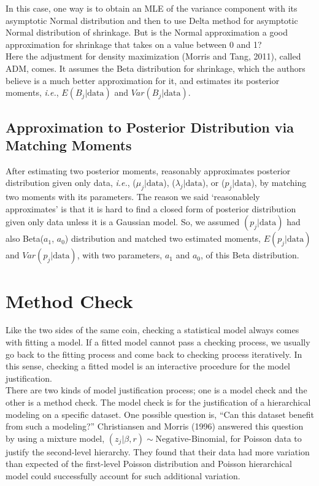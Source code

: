 \documentclass[article]{jss}
\begin{document}
In this case, one way is to obtain an MLE of the variance component with its asymptotic Normal distribution and then to use Delta method for asymptotic Normal distribution of shrinkage. But is the Normal approximation a good approximation for shrinkage that takes on a value between 0 and 1?
\\

Here the adjustment for density maximization (Morris and Tang, 2011), called ADM, comes. It assumes the Beta distribution for shrinkage, which the authors believe is a much better approximation for it, and estimates its posterior moments, \emph{i.e.}, $E(B_{j}\vert\textrm{data})$ and $Var(B_{j}\vert\textrm{data})$.

\subsection[Approximation to Posterior Distribution by Moment Matching]{Approximation to Posterior Distribution via Matching Moments}
After estimating two posterior moments,  reasonably approximates posterior distribution given only data, \emph{i.e.}, ($\mu_{j}\vert \textrm{data}$), ($\lambda_{j}\vert \textrm{data}$), or ($p_{j}\vert \textrm{data}$), by matching two moments with its parameters. The reason we said `reasonablely approximates' is that it is hard to find a closed form of posterior distribution given only data unless it is a Gaussian model. So, we assumed $(p_{j}\vert \textrm{data})$ had also Beta($a_{1}$, $a_{0}$) distribution and matched two estimated moments, $E(p_{j}\vert \textrm{data})$ and $Var(p_{j}\vert \textrm{data})$, with two parameters, $a_{1}$ and $a_{0}$, of this Beta distribution. 

\section[Method Check]{Method Check}
Like the two sides of the same coin, checking a statistical model always comes with fitting a model. If a fitted model cannot pass a checking process, we usually go back to the fitting process and come back to checking process iteratively. In this sense, checking a fitted model is an interactive procedure for the model justification.
\\

There are two kinds of model justification process; one is a model check and the other is a method check. The model check is for the justification of a hierarchical modeling on a specific dataset. One possible question is, ``Can this dataset benefit from such a modeling?'' Christiansen and Morris (1996) answered this question by using a mixture model, $(z_{j}\vert \beta, r)\sim\textrm{Negative-Binomial}$, for Poisson data to justify the second-level hierarchy. They found that their data had more variation than expected of the first-level Poisson distribution and Poisson hierarchical model could successfully account for such additional variation.
\\
\end{document}
